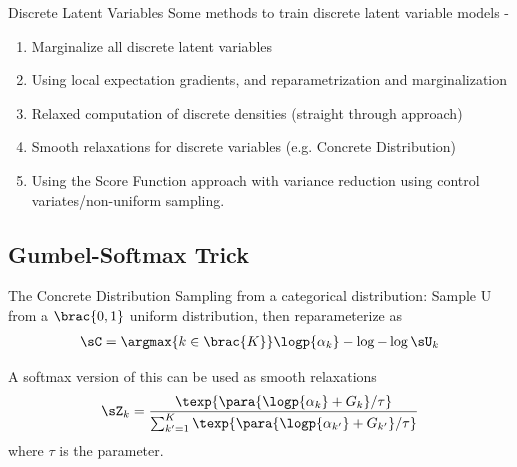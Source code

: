 \documentclass[9pt]{beamer}
\begin{document}
\begin{frame}{Discrete Latent Variables}
	Some methods to train discrete latent variable models -
	\begin{enumerate}
		\item Marginalize all discrete latent variables
		\item Using local expectation gradients, and reparametrization and marginalization %
		\item Relaxed computation of discrete densities (straight through approach)
		\item Smooth relaxations for discrete variables (e.g. Concrete Distribution)
		\item Using the Score Function approach with variance reduction using control variates/non-uniform sampling.
	\end{enumerate}
\end{frame}

\subsection{Gumbel-Softmax Trick}
\begin{frame}{The Concrete Distribution}
	Sampling from a categorical distribution: Sample U from a $\brac{0, 1}$ uniform distribution, then reparameterize as
	\begin{align*}
		\sC = \argmax{k \in \brac{K}} \logp{\alpha_k} - \log{-\log{\sU_k}}
	\end{align*}

	A softmax version of this can be used as smooth relaxations
	\begin{align*}
		\sZ_k = \frac{\texp{\para{\logp{\alpha_k} + G_k} / \tau}}{\sum_{k' = 1}^K \texp{\para{\logp{\alpha_{k'}} + G_{k'}} / \tau}}
	\end{align*}
	where $\tau$ is the  parameter.
\end{frame}
\end{document}
